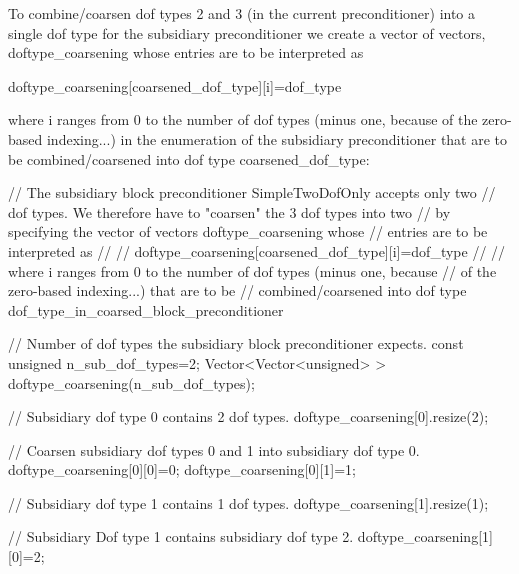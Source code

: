 To combine/coarsen dof types 2 and 3 (in the current preconditioner) into a single dof type for the subsidiary preconditioner we create a vector of vectors, {\ttfamily  doftype\+\_\+coarsening } whose entries are to be interpreted as

{\ttfamily  doftype\+\_\+coarsening\mbox{[}coarsened\+\_\+dof\+\_\+type\mbox{]}\mbox{[}i\mbox{]}=dof\+\_\+type}

where {\ttfamily i} ranges from 0 to the number of dof types (minus one, because of the zero-\/based indexing...) in the enumeration of the subsidiary preconditioner that are to be combined/coarsened into dof type {\ttfamily coarsened\+\_\+dof\+\_\+type\+:} 


\begin{DoxyCodeInclude}
   \textcolor{comment}{// The subsidiary block preconditioner SimpleTwoDofOnly accepts only two}
   \textcolor{comment}{// dof types. We therefore have to "coarsen" the 3 dof types into two}
   \textcolor{comment}{// by specifying the vector of vectors doftype\_coarsening whose}
   \textcolor{comment}{// entries are to be interpreted as}
   \textcolor{comment}{// }
   \textcolor{comment}{//    doftype\_coarsening[coarsened\_dof\_type][i]=dof\_type}
   \textcolor{comment}{//}
   \textcolor{comment}{// where i ranges from 0 to the number of dof types (minus one, because}
   \textcolor{comment}{// of the zero-based indexing...) that are to be}
   \textcolor{comment}{// combined/coarsened into dof type dof\_type\_in\_coarsed\_block\_preconditioner}


   \textcolor{comment}{// Number of dof types the subsidiary block preconditioner expects.}
   \textcolor{keyword}{const} \textcolor{keywordtype}{unsigned} n\_sub\_dof\_types=2;
   Vector<Vector<unsigned> > doftype\_coarsening(n\_sub\_dof\_types);
   
   \textcolor{comment}{// Subsidiary dof type 0 contains 2 dof types.}
   doftype\_coarsening[0].resize(2);

   \textcolor{comment}{// Coarsen subsidiary dof types 0 and 1 into subsidiary dof type 0.}
   doftype\_coarsening[0][0]=0;
   doftype\_coarsening[0][1]=1;
   
   \textcolor{comment}{// Subsidiary dof type 1 contains 1 dof types. }
   doftype\_coarsening[1].resize(1);
   
   \textcolor{comment}{// Subsidiary Dof type 1 contains subsidiary dof type 2.}
   doftype\_coarsening[1][0]=2;

\end{DoxyCodeInclude}


